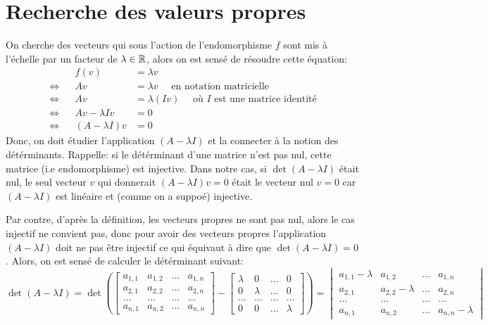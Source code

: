 \section{Recherche des valeurs propres}
On cherche des vecteurs qui sous l'action de l'endomorphisme $f$ sont mis à l'échelle par un facteur de  $\lambda \in \mathbb{R}$, alors on est sensé de résoudre cette équation:
\begin{align*}
    && f(v) &= \lambda v\\
    \iff&& Av &= \lambda v \quad \text{ en notation matricielle}\\
    \iff&& Av &= \lambda (Iv) \quad \text{ où } I \text{ est une matrice identité}\\
    \iff&& Av - \lambda Iv &= 0\\
    \iff&& (A - \lambda I)v &= 0
\end{align*}
Donc, on doit étudier l'application $(A - \lambda I)$ et la connecter à la notion des détérminants. Rappelle: si le détérminant d'une matrice n'est pas nul, cette matrice (i.e endomorphisme) est injective. Dans notre cas, si  $\det(A - \lambda I)$ était nul, le seul vecteur  $v$ qui donnerait  $(A - \lambda I)v = 0$ était le vecteur nul  $v = 0$ car  $(A - \lambda I)$ est linéaire et (comme on a suppoé) injective. 
\par
Par contre, d'après la définition, les vecteurs propres ne sont pas nul, alors le cas injectif ne convient pas, donc pour avoir des vecteurs propres l'application $(A - \lambda I)$ doit ne pas être injectif ce qui équivaut à dire que  $\det(A - \lambda I) = 0$. Alors, on est sensé de calculer le détérminant suivant:
\[
\det(A - \lambda I) = \det \left(\begin{bmatrix} 
    a_{1,1} & a_{1, 2} & \ldots & a_{1, n}\\
    a_{2,1} & a_{2, 2} & \ldots & a_{2, n}\\
    \ldots & \ldots & \ldots & \ldots\\
    a_{n,1} & a_{n,2} & \ldots & a_{n,n}
    \end{bmatrix}  - 
    \begin{bmatrix} 
        \lambda & 0 & \ldots & 0 \\
        0 & \lambda & \ldots & 0 \\
        \ldots & \ldots & \ldots & \ldots\\
        0 & 0 & \ldots & \lambda
    \end{bmatrix}\right) = 
    \begin{vmatrix} 
    a_{1,1} - \lambda & a_{1, 2} & \ldots & a_{1, n}\\
    a_{2,1} & a_{2, 2} - \lambda & \ldots & a_{2, n}\\
    \ldots & \ldots & \ldots & \ldots\\
    a_{n,1} & a_{n,2} & \ldots & a_{n,n} - \lambda
    \end{vmatrix}
\] 
